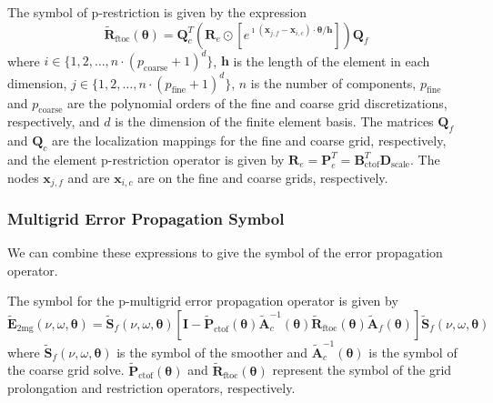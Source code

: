 \documentclass[review]{siamart190516}
\begin{document}
\begin{definition}\label{def:restriction_symbol}
The symbol of p-restriction is given by the expression
\begin{equation}
\tilde{\mathbf{R}}_{\text{ftoc}} \left( \boldsymbol{\theta} \right) = \mathbf{Q}_c^T \left( \mathbf{R}_e \odot \left[ e^{\imath \left( \mathbf{x}_{j, f} - \mathbf{x}_{i, c} \right) \cdot \boldsymbol{\theta} / \mathbf{h}} \right] \right) \mathbf{Q}_f
\end{equation}
where $i \in \lbrace 1, 2, \dots, n \cdot \left( p_{\text{coarse}} + 1 \right)^d \rbrace$, $\mathbf{h}$ is the length of the element in each dimension, $j \in \lbrace 1, 2, \dots, n \cdot \left( p_{\text{fine}} + 1 \right)^d \rbrace$, $n$ is the number of components, $p_{\text{fine}}$ and $p_{\text{coarse}}$ are the polynomial orders of the fine and coarse grid discretizations, respectively, and $d$ is the dimension of the finite element basis.
The matrices $\mathbf{Q}_f$ and $\mathbf{Q}_c$ are the localization mappings for the fine and coarse grid, respectively, and the element p-restriction operator is given by $\mathbf{R}_e = \mathbf{P}_e^T = \mathbf{B}_{\text{ctof}}^T \mathbf{D}_{\text{scale}}$.
The nodes $\mathbf{x}_{j, f}$ and are $\mathbf{x}_{i, c}$ are on the fine and coarse grids, respectively.
\end{definition}

\subsubsection{Multigrid Error Propagation Symbol}\label{sec:multigridsymbol}

We can combine these expressions to give the symbol of the error propagation operator.

\begin{definition}\label{def:pmultigrid_symbol}
The symbol for the p-multigrid error propagation operator is given by
\begin{equation}
\tilde{\mathbf{E}}_{\text{2mg}} \left( \nu, \omega, \boldsymbol{\theta} \right) = \tilde{\mathbf{S}}_f \left( \nu, \omega, \boldsymbol{\theta} \right) \left[ \mathbf{I} - \tilde{\mathbf{P}}_{\text{ctof}} \left( \boldsymbol{\theta} \right) \tilde{\mathbf{A}}_c^{-1} \left( \boldsymbol{\theta} \right) \tilde{\mathbf{R}}_{\text{ftoc}} \left( \boldsymbol{\theta} \right) \tilde{\mathbf{A}}_f \left( \boldsymbol{\theta} \right) \right] \tilde{\mathbf{S}}_f \left( \nu, \omega, \boldsymbol{\theta} \right)
\end{equation}
where $\tilde{\mathbf{S}}_f \left( \nu, \omega, \boldsymbol{\theta} \right)$ is the symbol of the smoother and $\tilde{\mathbf{A}}_c^{-1} \left( \boldsymbol{\theta} \right)$ is the symbol of the coarse grid solve.
$\tilde{\mathbf{P}}_{\text{ctof}} \left( \boldsymbol{\theta} \right)$ and $\tilde{\mathbf{R}}_{\text{ftoc}} \left( \boldsymbol{\theta} \right)$ represent the symbol of the grid prolongation and restriction operators, respectively.
\end{definition}
\end{document}
